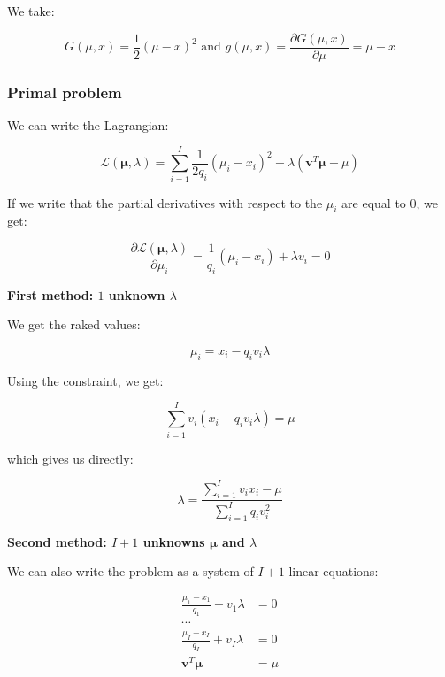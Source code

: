 \documentclass{tex/note}
\begin{document}
We take:

\begin{equation*}
G \left( \mu , x \right) = \frac{1}{2} \left( \mu - x \right) ^2 \text{ and } g \left( \mu , x \right) = \frac{\partial G \left( \mu , x \right)}{\partial \mu} = \mu - x
\end{equation*}

\subsubsection{Primal problem}

We can write the Lagrangian:

\begin{equation*}
\mathcal{L} \left( \bm{\mu} , \lambda \right) = \sum_{i = 1}^I \frac{1}{2 q_i} \left( \mu_i - x_i \right) ^2 + \lambda \left( \bm{v}^T \bm{\mu} - \mu \right)
\end{equation*}

If we write that the partial derivatives with respect to the $\mu_i$ are equal to $0$, we get:

\begin{equation*}
\frac{\partial \mathcal{L} \left( \bm{\mu} , \lambda \right)}{\partial \mu_i} =  \frac{1}{q_i} \left( \mu_i - x_i \right) + \lambda v_i = 0
\end{equation*}

\textbf{First method: $1$ unknown $\lambda$}

We get the raked values:

\begin{equation*}
\mu_i = x_i - q_i v_i \lambda
\end{equation*}

Using the constraint, we get:

\begin{equation*}
\sum_{i = 1}^I v_i \left( x_i - q_i v_i \lambda \right) = \mu
\end{equation*}

which gives us directly:

\begin{equation*}
\lambda = \frac{\sum_{i = 1}^I v_i x_i - \mu}{\sum_{i = 1}^I q_i v_i^2}
\end{equation*}

\textbf{Second method: $I + 1$ unknowns $\bm{\mu}$ and $\lambda$}

We can also write the problem as a system of $I + 1$ linear equations:

\begin{align*}
\frac{\mu_1 - x_1}{q_1} + v_1 \lambda &= 0 \\
\cdots & \\
\frac{\mu_I - x_I}{q_I} + v_I \lambda &= 0 \\
\bm{v}^T \bm{\mu} &= \mu
\end{align*}
\end{document}

